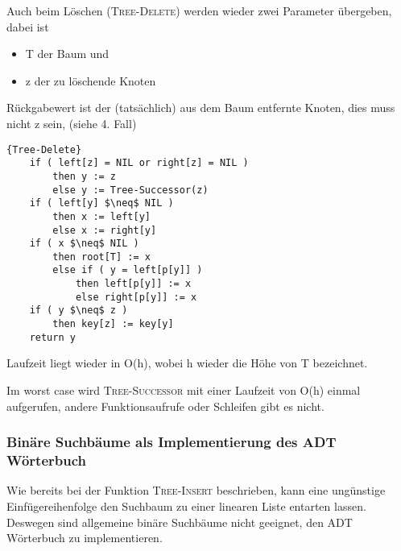 		Auch beim Löschen (\textsc{Tree-Delete}) werden wieder zwei Parameter übergeben, dabei ist
		\begin{itemize}
			\item T der Baum und
		 	\item z der zu löschende Knoten
		\end{itemize}
		Rückgabewert ist der (tatsächlich) aus dem Baum entfernte Knoten, dies muss nicht z sein, (siehe 4. Fall)
		\begin{Algorithmus}
                        \begin{lstlisting}[frame=tlrb, mathescape=true, title=\textsc{Tree-Delete}, gobble=4]{Tree-Delete}
	if ( left[z] = NIL or right[z] = NIL )
		then y := z
		else y := Tree-Successor(z)
	if ( left[y] $\neq$ NIL )
		then x := left[y]
		else x := right[y]
	if ( x $\neq$ NIL )
		then root[T] := x
		else if ( y = left[p[y]] )
			then left[p[y]] := x
			else right[p[y]] := x
	if ( y $\neq$ z )
		then key[z] := key[y]
	return y
			\end{lstlisting}

		Laufzeit liegt wieder in O(h), wobei  h wieder die Höhe von T bezeichnet.
		\end{Algorithmus}		

		Im worst case wird \textsc{Tree-Successor} mit einer Laufzeit von O(h) einmal aufgerufen, 
		andere Funktionsaufrufe oder Schleifen gibt es nicht.
\subsubsection{Binäre Suchbäume als Implementierung des ADT Wörterbuch}
 		\centering
	  	Wie bereits bei der Funktion \textsc{Tree-Insert} beschrieben, kann eine ungünstige 
	  	Einfügereihenfolge den Suchbaum zu einer linearen Liste entarten lassen. Deswegen sind allgemeine 
	  	binäre Suchbäume nicht geeignet, den ADT Wörterbuch zu implementieren.  	
